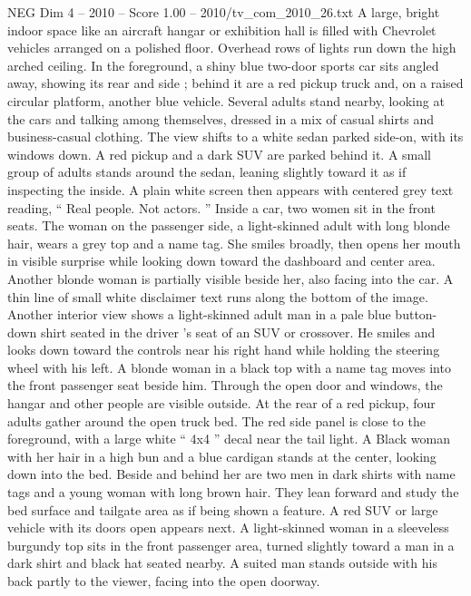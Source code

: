 \begin{textsample}{NEG Dim 4 – 2010 – Score 1.00 – 2010/tv\_com\_2010\_26.txt}  \label{ex:f4_neg_078}
A large, bright indoor space like an aircraft hangar or exhibition hall is filled with Chevrolet vehicles arranged on a polished floor.
Overhead rows of lights run down the high arched ceiling.
In the foreground, a shiny blue two-door sports car sits angled away, showing its rear and side ; behind it are a red pickup truck and, on a raised circular platform, another blue vehicle.
Several adults stand nearby, looking at the cars and talking among themselves, dressed in a mix of casual shirts and business-casual clothing.
The view shifts to a white sedan parked side-on, with its windows down.
A red pickup and a dark SUV are parked behind it.
A small group of adults stands around the sedan, leaning slightly toward it as if inspecting the inside.
A plain white screen then appears with centered grey text reading, “ Real people.
Not actors. ” Inside a car, two women sit in the front seats.
The woman on the passenger side, a light-skinned adult with long blonde hair, wears a grey top and a name tag.
She smiles broadly, then opens her mouth in visible surprise while looking down toward the dashboard and center area.
Another blonde woman is partially visible beside her, also facing into the car.
A thin line of small white disclaimer text runs along the bottom of the image.
Another interior view shows a light-skinned adult man in a pale blue button-down shirt seated in the driver ’s seat of an SUV or crossover.
He smiles and looks down toward the controls near his right hand while holding the steering wheel with his left.
A blonde woman in a black top with a name tag moves into the front passenger seat beside him.
Through the open door and windows, the hangar and other people are visible outside.
At the rear of a red pickup, four adults gather around the open truck bed.
The red side panel is close to the foreground, with a large white “ 4x4 ” decal near the tail light.
A Black woman with her hair in a high bun and a blue cardigan stands at the center, looking down into the bed.
Beside and behind her are two men in dark shirts with name tags and a young woman with long brown hair.
They lean forward and study the bed surface and tailgate area as if being shown a feature.
A red SUV or large vehicle with its doors open appears next.
A light-skinned woman in a sleeveless burgundy top sits in the front passenger area, turned slightly toward a man in a dark shirt and black hat seated nearby.
A suited man stands outside with his back partly to the viewer, facing into the open doorway.

\end{textsample}
